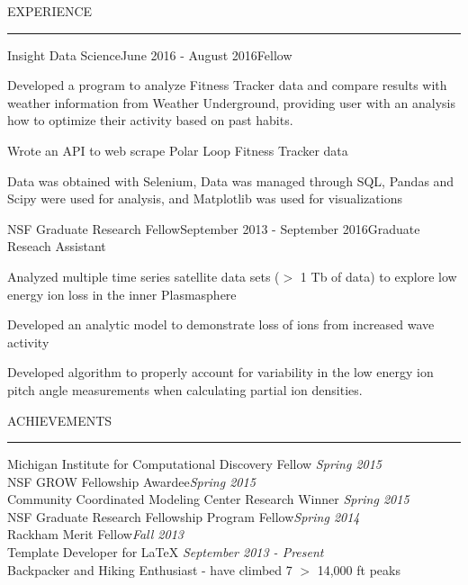 \documentclass{resume} %
\renewenvironment{rSection}[1]{
\sectionskip
\textcolor{RoyalPurple}{\MakeUppercase{#1}}
\sectionlineskip
\hrule
\begin{list}{}{
\setlength{\leftmargin}{1.5em}
}
\item[]
}{
\end{list}
}
\begin{document}
\begin{rSection}{Experience}

\begin{rSubsection}{Insight Data Science}{June 2016 - August 2016}{Fellow}{}
\item Developed a program to analyze Fitness Tracker data and compare results with weather information from Weather Underground, providing user with an analysis how to optimize their activity based on past habits.
\item Wrote an API to web scrape Polar Loop Fitness Tracker data 
\item Data was obtained with Selenium, Data was managed through SQL, Pandas and Scipy were used for analysis, and Matplotlib was used for visualizations
\end{rSubsection}



\begin{rSubsection}{NSF Graduate Research Fellow}{September 2013 - September 2016}{Graduate Reseach Assistant }{}
\item Analyzed multiple time series satellite data sets ($>$ 1 Tb of data) to explore low energy ion loss in the inner Plasmasphere 
\item Developed an analytic model to demonstrate loss of ions from increased wave activity
\item Developed algorithm to properly account for variability in the low energy ion pitch angle measurements when calculating partial ion densities. 
\end{rSubsection}

\end{rSection}



\begin{rSection}{Achievements} \itemsep -2pt
{Michigan Institute for Computational Discovery Fellow }\hfill {\em Spring 2015} \\
{NSF GROW Fellowship Awardee}\hfill {\em Spring 2015} \\
{Community Coordinated Modeling Center Research Winner} \hfill {\em Spring 2015} \\
{NSF Graduate Research Fellowship Program Fellow}\hfill {\em Spring 2014}\\
{Rackham Merit Fellow}\hfill {\em Fall 2013}\\
{Template Developer for LaTeX} \hfill {\em September 2013 - Present} \\
{Backpacker and Hiking Enthusiast - have climbed 7 $>$ 14,000 ft peaks}
\end{rSection}
\end{document}
